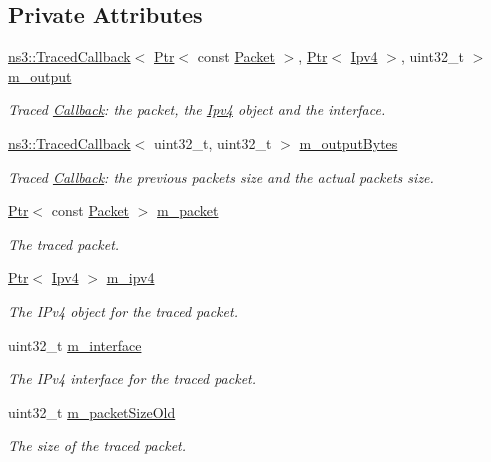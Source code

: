 \subsection*{Private Attributes}
\begin{DoxyCompactItemize}
\item 
\hyperlink{classns3_1_1TracedCallback}{ns3\+::\+Traced\+Callback}$<$ \hyperlink{classns3_1_1Ptr}{Ptr}$<$ const \hyperlink{classns3_1_1Packet}{Packet} $>$, \hyperlink{classns3_1_1Ptr}{Ptr}$<$ \hyperlink{classns3_1_1Ipv4}{Ipv4} $>$, uint32\+\_\+t $>$ \hyperlink{classns3_1_1Ipv4PacketProbe_a7c5ef989cc92b4b2d09daa3cf4335cb0}{m\+\_\+output}
\begin{DoxyCompactList}\small\item\em Traced \hyperlink{classns3_1_1Callback}{Callback}\+: the packet, the \hyperlink{classns3_1_1Ipv4}{Ipv4} object and the interface. \end{DoxyCompactList}\item 
\hyperlink{classns3_1_1TracedCallback}{ns3\+::\+Traced\+Callback}$<$ uint32\+\_\+t, uint32\+\_\+t $>$ \hyperlink{classns3_1_1Ipv4PacketProbe_a4e8701fc7f85299b2cc6d8fd5082202c}{m\+\_\+output\+Bytes}
\begin{DoxyCompactList}\small\item\em Traced \hyperlink{classns3_1_1Callback}{Callback}\+: the previous packet\textquotesingle{}s size and the actual packet\textquotesingle{}s size. \end{DoxyCompactList}\item 
\hyperlink{classns3_1_1Ptr}{Ptr}$<$ const \hyperlink{classns3_1_1Packet}{Packet} $>$ \hyperlink{classns3_1_1Ipv4PacketProbe_afd7bd4c27110432ba13e62c4c1f6d71b}{m\+\_\+packet}
\begin{DoxyCompactList}\small\item\em The traced packet. \end{DoxyCompactList}\item 
\hyperlink{classns3_1_1Ptr}{Ptr}$<$ \hyperlink{classns3_1_1Ipv4}{Ipv4} $>$ \hyperlink{classns3_1_1Ipv4PacketProbe_af9e89c6f1e0c7985487bfcaaf1acd8d6}{m\+\_\+ipv4}
\begin{DoxyCompactList}\small\item\em The I\+Pv4 object for the traced packet. \end{DoxyCompactList}\item 
uint32\+\_\+t \hyperlink{classns3_1_1Ipv4PacketProbe_aa4dc294ce9d15a13c258a7f4eaf53357}{m\+\_\+interface}
\begin{DoxyCompactList}\small\item\em The I\+Pv4 interface for the traced packet. \end{DoxyCompactList}\item 
uint32\+\_\+t \hyperlink{classns3_1_1Ipv4PacketProbe_a1ece8c9dd8ac358c5e45eb80beecce40}{m\+\_\+packet\+Size\+Old}
\begin{DoxyCompactList}\small\item\em The size of the traced packet. \end{DoxyCompactList}\end{DoxyCompactItemize}
